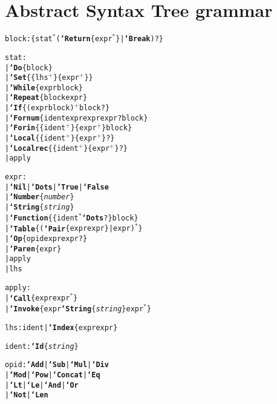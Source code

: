 \def\T#1{{\bf`#1}}
\def\L#1{\{#1\}}
\def\P#1{{\it #1}}
\def\C#1{[\hspace{-.4em}[#1]\hspace{-.4em}]}
\def\V#1{{\it #1}}
\def\plus{\ensuremath{{}^{+}}}
\def\star{\ensuremath{{}^{*}}}
\def\TRANS{\ensuremath{\Longrightarrow}}
% 

\section{Abstract Syntax Tree grammar}

\begin{alltt}

block: \L{ stat\star (\T{Return}\L{expr\star} | \T{Break})? }

stat:
| \T{Do}\L{ block }
| \T{Set}\L{ \L{lhs\plus} \L{expr\plus} }
| \T{While}\L{ expr block }
| \T{Repeat}\L{ block expr }
| \T{If}\L{ (expr block)\plus block? }
| \T{Fornum}\L{ ident expr expr expr? block }
| \T{Forin}\L{ \L{ident\plus} \L{expr\plus} block }
| \T{Local}\L{ \L{ident\plus} \L{expr\plus}? }
| \T{Localrec}\L{ \L{ident\plus} \L{expr\plus}? }
| apply

expr:
| \T{Nil} | \T{Dots} | \T{True} | \T{False}
| \T{Number}\L{ \P{number} }
| \T{String}\L{ \P{string} }
| \T{Function}\L{ \L{ ident\star \T{Dots}? } block } 
| \T{Table}\L{ ( \T{Pair}\L{ expr expr } | expr )\star }
| \T{Op}\L{ opid expr expr? }
| \T{Paren}\L{ expr }
| apply
| lhs

apply:
| \T{Call}\L{ expr expr\star }
| \T{Invoke}\L{ expr \T{String}\L{ \P{string} } expr\star }

lhs: ident | \T{Index}\L{ expr expr }

ident: \T{Id}\L{ \P{string} }

opid: \T{Add}    | \T{Sub}    | \T{Mul}    | \T{Div} 
    | \T{Mod}    | \T{Pow}    | \T{Concat} | \T{Eq} 
    | \T{Lt}     | \T{Le}     | \T{And}    | \T{Or}
    | \T{Not}    | \T{Len}

\end{alltt}
  


